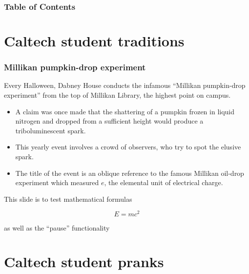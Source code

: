 \begin{frame}
\frametitle{Table of Contents}
\tableofcontents
\end{frame}


\section{Caltech student traditions}

\begin{frame}
\frametitle{Millikan pumpkin-drop experiment}
Every Halloween, Dabney House conducts the infamous ``Millikan pumpkin-drop experiment'' from the top of Millikan Library, the highest point on campus.

\begin{itemize}
    \item<1-> A claim was once made that the shattering of a pumpkin frozen in liquid nitrogen and dropped from a sufficient height would produce a triboluminescent spark. 
    \item<2-> This yearly event involves a crowd of observers, who try to spot the elusive spark.
    \item<3-> The title of the event is an oblique reference to the famous Millikan oil-drop experiment which measured $e$, the elemental unit of electrical charge.
\end{itemize}

\end{frame}



\begin{frame}  
This slide is to test mathematical formulas

$$E=mc^2$$ 

as well as the ``pause'' functionality
\end{frame}

\section{Caltech student pranks}


